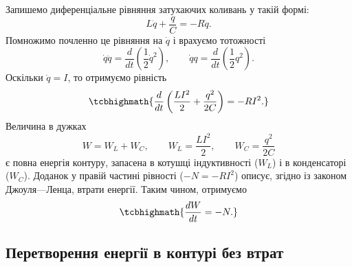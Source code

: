 Запишемо диференціальне рівняння затухаючих коливань у такій формі:
\begin{equation}\label{eq:damped_equation_energy}
	L\ddot{q} + \frac{q}{C} = -R\dot{q}.
\end{equation}
Помножимо почленно це рівняння на $\dot{q}$ і врахуємо тотожності
\begin{equation}\label{eq:identities}
	\dot{q}\ddot{q} = \frac{d}{dt}\left(\frac{1}{2}\dot{q}^2\right), \qquad
	\dot{q}q = \frac{d}{dt}\left(\frac{1}{2}q^2\right).
\end{equation}
Оскільки $\dot{q} = I$, то отримуємо рівність
\begin{equation}\label{eq:energy_balance}
	\tcbhighmath{
		\frac{d}{dt}\left(\frac{LI^2}{2} + \frac{q^2}{2C}\right) = -RI^2.
	}
\end{equation}
Величина в дужках
\begin{equation}\label{eq:total_energy}
	W = W_L + W_C, \qquad W_L = \frac{LI^2}{2}, \qquad W_C = \frac{q^2}{2C}
\end{equation}
є повна енергія контуру, запасена в котушці індуктивності ($W_L$) і в конденсаторі ($W_C$). Доданок у правій частині рівності ($-N = -RI^2$) описує, згідно із законом Джоуля---Ленца, втрати енергії. Таким чином, отримуємо
\begin{equation}\label{eq:energy_loss}
	\tcbhighmath{
		\frac{dW}{dt} = -N.
	}
\end{equation}

\subsection*{Перетворення енергії в контурі без втрат}


